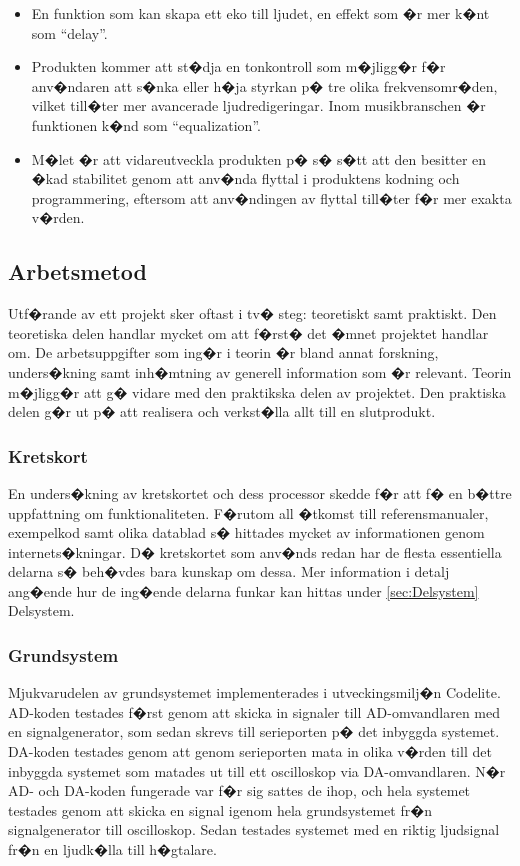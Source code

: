 \documentclass[a4paper]{article}
\begin{document}
\begin{itemize}
  \item En funktion som kan skapa ett eko till ljudet, en effekt som �r mer k�nt som ``delay''.
  \item Produkten kommer att st�dja en tonkontroll som m�jligg�r f�r anv�ndaren att s�nka eller h�ja styrkan p� tre olika frekvensomr�den, vilket till�ter mer avancerade ljudredigeringar. Inom musikbranschen �r funktionen k�nd som ``equalization''. 
  \item M�let �r att vidareutveckla produkten p� s� s�tt att den besitter en �kad stabilitet genom att anv�nda flyttal i produktens kodning och programmering, eftersom att anv�ndingen av flyttal till�ter f�r mer exakta v�rden.

\end{itemize}

\subsection{Arbetsmetod}

Utf�rande av ett projekt sker oftast i tv� steg: teoretiskt samt praktiskt. Den teoretiska delen handlar mycket om att f�rst� det �mnet projektet handlar om. De arbetsuppgifter som ing�r i teorin �r bland annat forskning, unders�kning samt inh�mtning av generell information som �r relevant. Teorin m�jligg�r att g� vidare med den praktikska delen av projektet. Den praktiska delen g�r ut p� att realisera och verkst�lla allt till en slutprodukt.

\subsubsection{Kretskort} 
En unders�kning av kretskortet och dess processor skedde f�r att f� en b�ttre uppfattning om funktionaliteten. F�rutom all �tkomst till referensmanualer, exempelkod samt olika datablad s� hittades mycket av informationen genom internets�kningar. D� kretskortet som anv�nds redan har de flesta essentiella delarna s� beh�vdes bara kunskap om dessa. Mer information i detalj ang�ende hur de ing�ende delarna funkar kan hittas under \ref{sec:Delsystem} Delsystem.

\subsubsection{Grundsystem} 
Mjukvarudelen av grundsystemet implementerades i utveckingsmilj�n Codelite. AD-koden testades f�rst
genom att skicka in signaler till AD-omvandlaren med en signalgenerator, som sedan skrevs till
serieporten p� det inbyggda systemet. DA-koden testades genom att genom serieporten mata in olika
v�rden till det inbyggda systemet som matades ut till ett oscilloskop via DA-omvandlaren. N�r AD-
och DA-koden fungerade var f�r sig sattes de ihop, och  hela systemet testades genom att skicka
en signal igenom hela grundsystemet fr�n signalgenerator till oscilloskop. Sedan testades
systemet med en riktig ljudsignal fr�n en ljudk�lla till h�gtalare.
\end{document}
